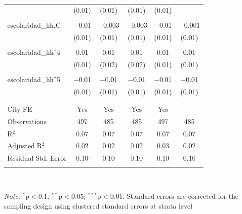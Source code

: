 \begin{table}[H]
\begin{tabularx}{0.9\textwidth}{@{\extracolsep{-7pt}}lccccc}
& (0.01) & (0.01) & (0.01) & (0.01) \\    & & & & & \\   escolaridad\_hh.C & $-$0.01 & $-$0.003 & $-$0.003 & $-$0.01 & $-$0.001 \\    & (0.01) & (0.01) & (0.01) & (0.01) & (0.01) \\    & & & & & \\   escolaridad\_hh$\hat{\mkern6mu}$4 & 0.01 & 0.01 & 0.01 & 0.01 & 0.01 \\    & (0.01) & (0.02) & (0.02) & (0.01) & (0.01) \\    & & & & & \\   escolaridad\_hh$\hat{\mkern6mu}$5 & $-$0.01 & $-$0.01 & $-$0.01 & $-$0.01 & $-$0.01 \\    & (0.01) & (0.01) & (0.01) & (0.01) & (0.01) \\    & & & & & \\  \hline \\[-1.8ex]  City FE & Yes & Yes & Yes & Yes &  \\  Observations & 497 & 485 & 485 & 497 & 485 \\  R$^{2}$ & 0.07 & 0.07 & 0.07 & 0.07 & 0.07 \\  Adjusted R$^{2}$ & 0.02 & 0.02 & 0.02 & 0.03 & 0.02 \\  Residual Std. Error & 0.10 & 0.10 & 0.10 & 0.10 & 0.10 \\  \hline  \hline \\[-1.8ex]  \end{tabularx} \\ \parbox[]{\textwidth}{\textit{Note:} $^{*}$p$<$0.1; $^{**}$p$<$0.05; $^{***}$p$<$0.01. Standard errors are corrected for the sampling design using clustered standard errors at strata level }  \end{table} 